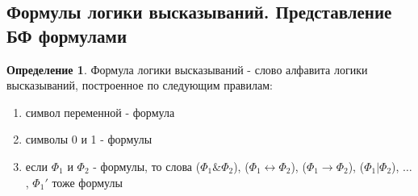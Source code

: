 \documentclass[a4paper]{article}
\theoremstyle{definition}
\newtheorem*{definition}{Определение}
\theoremstyle{remark}
\begin{document}
    \subsection{Формулы логики высказываний. Представление БФ формулами}
    \begin{definition}
        Формула логики высказываний - слово алфавита логики высказываний,
        построенное по следующим правилам:
        \begin{enumerate}
            \item символ переменной - формула
            \item символы 0 и 1 - формулы
            \item если $\Phi_1$ и $\Phi_2$ - формулы, то слова ($\Phi_1 \& \Phi_2$),
            ($\Phi_1 \leftrightarrow \Phi_2$), ($\Phi_1 \rightarrow \Phi_2$), 
            ($\Phi_1 | \Phi_2$), $\dots$ , $\Phi_1 '$ тоже формулы
        \end{enumerate}
    \end{definition}
\end{document}
